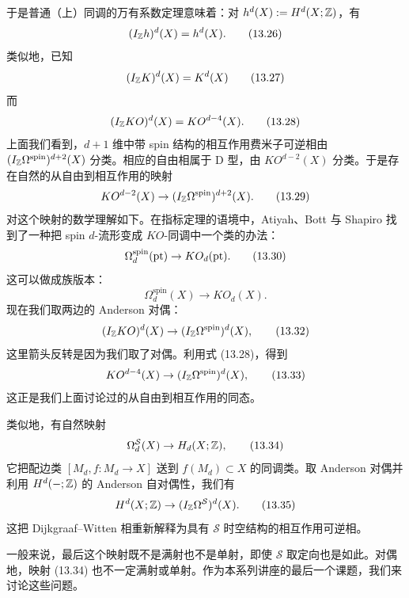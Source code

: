 于是普通（上）同调的万有系数定理意味着：对 $h^d(X):=H^d(X;\mathbb{Z})$，有
\begin{equation}
(I_{\mathbb{Z}}h)^d(X)=h^d(X). \tag{13.26}
\end{equation}
类似地，已知
\begin{equation}
(I_{\mathbb{Z}}K)^d(X)=K^d(X) \tag{13.27}
\end{equation}
而
\begin{equation}
(I_{\mathbb{Z}}KO)^d(X)=KO^{d-4}(X). \tag{13.28}
\end{equation}
上面我们看到，$d+1$ 维中带 spin 结构的相互作用费米子可逆相由 $(I_{\mathbb{Z}}\Omega^{\mathrm{spin}})^{d+2}(X)$ 分类。相应的自由相属于 D 型，由 $KO^{d-2}(X)$ 分类。于是存在自然的从自由到相互作用的映射
\begin{equation}
KO^{d-2}(X)\to(I_{\mathbb{Z}}\Omega^{\mathrm{spin}})^{d+2}(X). \tag{13.29}
\end{equation}
对这个映射的数学理解如下。在指标定理的语境中，Atiyah、Bott 与 Shapiro 找到了一种把 spin $d$-流形变成 $KO$-同调中一个类的办法：
\begin{equation}
\Omega_d^{\mathrm{spin}}(\mathrm{pt})\to KO_d(\mathrm{pt}). \tag{13.30}
\end{equation}
这可以做成族版本：
\begin{equation}
\Omega_d^{\mathrm{spin}}(X)\to KO_d(X). \tag{13.31}
\end{equation}
现在我们取两边的 Anderson 对偶：
\begin{equation}
(I_{\mathbb{Z}}KO)^d(X)\to(I_{\mathbb{Z}}\Omega^{\mathrm{spin}})^d(X), \tag{13.32}
\end{equation}
这里箭头反转是因为我们取了对偶。利用式 (13.28)，得到
\begin{equation}
KO^{d-4}(X)\to(I_{\mathbb{Z}}\Omega^{\mathrm{spin}})^d(X), \tag{13.33}
\end{equation}
这正是我们上面讨论过的从自由到相互作用的同态。

类似地，有自然映射
\begin{equation}
\Omega_d^{\mathcal S}(X)\to H_d(X;\mathbb{Z}), \tag{13.34}
\end{equation}
它把配边类 $[M_d,f:M_d\to X]$ 送到 $f(M_d)\subset X$ 的同调类。取 Anderson 对偶并利用 $H^d(-;\mathbb{Z})$ 的 Anderson 自对偶性，我们有
\begin{equation}
H^d(X;\mathbb{Z})\to(I_{\mathbb{Z}}\Omega^{\mathcal S})^d(X). \tag{13.35}
\end{equation}
这把 Dijkgraaf--Witten 相重新解释为具有 $\mathcal S$ 时空结构的相互作用可逆相。

一般来说，最后这个映射既不是满射也不是单射，即使 $\mathcal S$ 取定向也是如此。对偶地，映射 (13.34) 也不一定满射或单射。作为本系列讲座的最后一个课题，我们来讨论这些问题。

